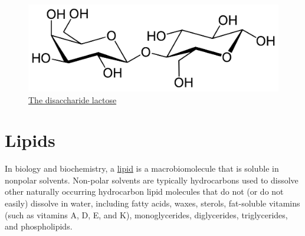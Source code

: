 \begin{figure}

{\centering \includegraphics[width=0.7\linewidth]{./figures/chemistry/Beta-D-Lactose} 

}

\caption{\href{https://commons.wikimedia.org/wiki/File:Beta-D-Lactose.svg}{The disaccharide lactose}}\label{fig:lactosestruc}
\end{figure}

\hypertarget{lipids}{%
\section{Lipids}\label{lipids}}

In biology and biochemistry, a \href{https://en.wikipedia.org/wiki/Lipid}{lipid} is a macrobiomolecule that is soluble in nonpolar solvents. Non-polar solvents are typically hydrocarbons used to dissolve other naturally occurring hydrocarbon lipid molecules that do not (or do not easily) dissolve in water, including fatty acids, waxes, sterols, fat-soluble vitamins (such as vitamins A, D, E, and K), monoglycerides, diglycerides, triglycerides, and phospholipids.



